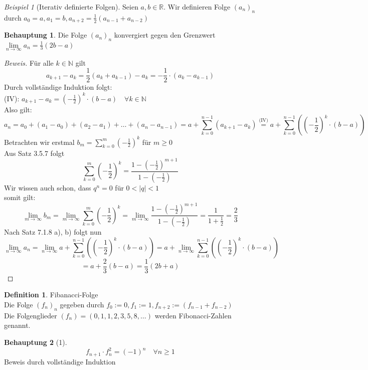 \documentclass[12pt,a4paper,titlepage]{article} %
\theoremstyle{definition}
\newtheorem{defi}[satz]{Definition}
\newtheorem*{beh}{Behauptung}
\theoremstyle{remark}
\newtheorem*{bsp}{Beispiel}
\newenvironment{bew}{\begin{proof}[Beweis]}{\end{proof}}
\newcommand{\N}{\mathbb{N}}
\newcommand{\R}{\mathbb{R}}
\newcommand{\limes}[1]{\lim\limits_{#1\rightarrow\infty}}
\begin{document}
	\begin{bsp} [Iterativ definierte Folgen]
		Seien \(a, b \in \R\). Wir definieren Folge \((a_n)_n\) durch \(a_0 = a, a_1 = b, a_{n+2} = \frac{1}{2}\left(a_{n-1} + a_{n-2}\right)\)\\
		\begin{beh}
			Die Folge \((a_n)_n\) konvergiert gegen den Grenzwert \(\limes{n} a_n = \frac{1}{3}\left(2b - a\right)\)
		\end{beh}
		\begin{bew}
			Für alle \(k \in \N\) gilt
			\[a_{k+1} - a_k = \frac{1}{2}\left(a_{k} + a_{k-1}\right) - a_k = -\frac{1}{2} \cdot (a_k - a_{k-1})\]
			Durch vollständige Induktion folgt:\\
			(IV): \(a_{k+1} - a_k =  (-\frac{1}{2})^k \cdot (b - a) \quad \forall k \in \N\)\\
			Also gilt:
			\[a_n = a_0 + (a_1 - a_0) + (a_2 - a_1) + \dots + (a_n - a_{n-1}) = a + \sum_{k=0}^{n-1}(a_{k+1} - a_k) \overset{\text{(IV)}}{=} a + \sum_{k=0}^{n-1} \left(\left(-\frac{1}{2}\right)^k \cdot (b - a)\right)\]
			Betrachten wir erstmal \(b_m = \sum_{k=0}^{m} (-\frac{1}{2})^k\) für \(m \geq 0\)\\
			Aus Satz 3.5.7 folgt
			\[\sum_{k=0}^{m} (-\frac{1}{2})^k = \frac{1-(-\frac{1}{2})^{m+1}}{1-(-\frac{1}{2})}\]
			Wir wissen auch schon, dass \(q^n = 0\) für \(0 < |q| < 1\)\\
			somit gilt:
			\[\limes{m} b_m = \limes{m} \sum_{k=0}^{m} (-\frac{1}{2})^k = \limes{m} \frac{1-(-\frac{1}{2})^{m+1}}{1-(-\frac{1}{2})} = \frac{1}{1 + \frac{1}{2}} = \frac{2}{3}\]
			Nach Satz 7.1.8 a), b) folgt nun
			\[\limes{n} a_n = \limes{n} a + \sum_{k=0}^{n-1} \left(\left(-\frac{1}{2}\right)^k \cdot (b - a)\right) = a + \limes{n} \sum_{k=0}^{n-1} \left(\left(-\frac{1}{2}\right)^k \cdot (b - a)\right)\]
			\[= a + \frac{2}{3}(b - a) = \frac{1}{3}(2b + a)\]
		\end{bew}
	\end{bsp}
	\begin{defi}
		Fibanacci-Folge\\
		Die Folge \((f_n)_n\) gegeben durch \(f_0 := 0, f_1 := 1, f_{n+2} := (f_{n-1} + f_{n-2})\)\\
		Die Folgenglieder \((f_n) = (0, 1, 1, 2, 3, 5, 8, \dots)\) werden Fibonacci-Zahlen genannt.
	\end{defi}
	\begin{beh}[1]
		\[f_{n+1} \cdot f_n^2 = (-1)^n \quad \forall n \geq 1\]
		Beweis durch vollständige Induktion
	\end{beh}
\end{document}
